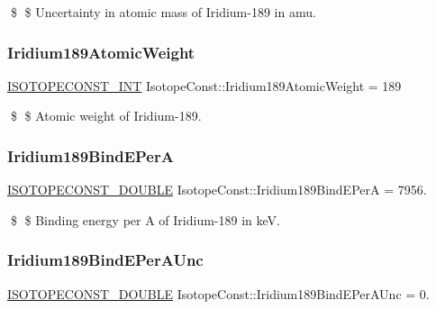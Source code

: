 \$ \$ Uncertainty in atomic mass of Iridium-\/189 in amu. \mbox{\label{group___isotope_const-_iridium-_ir189_ga661a9aeeb86e87ca9b3cca431e92bc45}} 
\subsubsection{\texorpdfstring{Iridium189\+Atomic\+Weight}{Iridium189AtomicWeight}}
{\footnotesize\ttfamily \mbox{\hyperlink{group___isotope_const-_macros_ga5f18360b3e99483a35c32d789e62621c}{I\+S\+O\+T\+O\+P\+E\+C\+O\+N\+S\+T\+\_\+\+I\+NT}} Isotope\+Const\+::\+Iridium189\+Atomic\+Weight = 189}

\$ \$ Atomic weight of Iridium-\/189. \mbox{\label{group___isotope_const-_iridium-_ir189_ga599bb1181fac58ce262d4af82a27d1d1}} 
\subsubsection{\texorpdfstring{Iridium189\+Bind\+E\+PerA}{Iridium189BindEPerA}}
{\footnotesize\ttfamily \mbox{\hyperlink{group___isotope_const-_macros_ga8f45a7272ce02c0b4c65c44636ed719a}{I\+S\+O\+T\+O\+P\+E\+C\+O\+N\+S\+T\+\_\+\+D\+O\+U\+B\+LE}} Isotope\+Const\+::\+Iridium189\+Bind\+E\+PerA = 7956.}

\$ \$ Binding energy per A of Iridium-\/189 in keV. \mbox{\label{group___isotope_const-_iridium-_ir189_gafff85c53ce160a8241e946ae1fec0646}} 
\subsubsection{\texorpdfstring{Iridium189\+Bind\+E\+Per\+A\+Unc}{Iridium189BindEPerAUnc}}
{\footnotesize\ttfamily \mbox{\hyperlink{group___isotope_const-_macros_ga8f45a7272ce02c0b4c65c44636ed719a}{I\+S\+O\+T\+O\+P\+E\+C\+O\+N\+S\+T\+\_\+\+D\+O\+U\+B\+LE}} Isotope\+Const\+::\+Iridium189\+Bind\+E\+Per\+A\+Unc = 0.}

